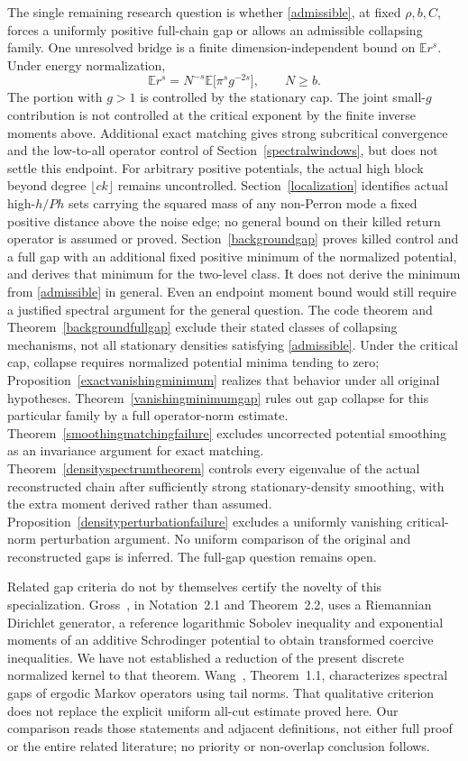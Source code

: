 \documentclass[11pt]{article}
\newcommand{\E}{\mathbb E}
\begin{document}
The single remaining research question is whether \eqref{admissible}, at fixed $\rho,b,C$, forces a uniformly positive full-chain gap or allows an admissible collapsing family. One unresolved bridge is a finite dimension-independent bound on $\E r^s$. Under energy normalization,
\[
 \E r^s=N^{-s}\E\bigl[\pi^s g^{-2s}\bigr],\qquad N\geq b.
\]
The portion with $g>1$ is controlled by the stationary cap. The joint small-$g$ contribution is not controlled at the critical exponent by the finite inverse moments above. Additional exact matching gives strong subcritical convergence and the low-to-all operator control of Section~\ref{spectralwindows}, but does not settle this endpoint. For arbitrary positive potentials, the actual high block beyond degree $\lfloor ck\rfloor$ remains uncontrolled. Section~\ref{localization} identifies actual high-$h/Ph$ sets carrying the squared mass of any non-Perron mode a fixed positive distance above the noise edge; no general bound on their killed return operator is assumed or proved. Section~\ref{backgroundgap} proves killed control and a full gap with an additional fixed positive minimum of the normalized potential, and derives that minimum for the two-level class. It does not derive the minimum from \eqref{admissible} in general. Even an endpoint moment bound would still require a justified spectral argument for the general question. The code theorem and Theorem~\ref{backgroundfullgap} exclude their stated classes of collapsing mechanisms, not all stationary densities satisfying \eqref{admissible}. Under the critical cap, collapse requires normalized potential minima tending to zero; Proposition~\ref{exactvanishingminimum} realizes that behavior under all original hypotheses. Theorem~\ref{vanishingminimumgap} rules out gap collapse for this particular family by a full operator-norm estimate. Theorem~\ref{smoothingmatchingfailure} excludes uncorrected potential smoothing as an invariance argument for exact matching. Theorem~\ref{densityspectrumtheorem} controls every eigenvalue of the actual reconstructed chain after sufficiently strong stationary-density smoothing, with the extra moment derived rather than assumed. Proposition~\ref{densityperturbationfailure} excludes a uniformly vanishing critical-norm perturbation argument. No uniform comparison of the original and reconstructed gaps is inferred. The full-gap question remains open.

Related gap criteria do not by themselves certify the novelty of this
specialization. Gross~\cite{gross2025}, in Notation~2.1 and Theorem~2.2,
uses a Riemannian Dirichlet generator, a reference logarithmic Sobolev
inequality and exponential moments of an additive Schrodinger potential
to obtain transformed coercive inequalities. We have not established a
reduction of the present discrete normalized kernel to that theorem.
Wang~\cite{wang2013}, Theorem~1.1, characterizes spectral gaps of ergodic
Markov operators using tail norms. That qualitative criterion does not
replace the explicit uniform all-cut estimate proved here. Our comparison
reads those statements and adjacent definitions, not either full proof or
the entire related literature; no priority or non-overlap conclusion follows.
\end{document}

